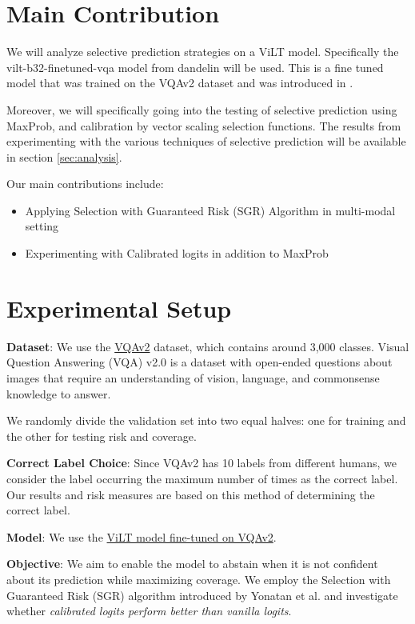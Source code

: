 \documentclass[
	english,
	accentcolor=8b,
	type=intern,
	marginpar=false
	]{tudapub}
\begin{document}
\section{Main Contribution}
\label{sec:approach}
We will analyze selective prediction strategies on a ViLT model. Specifically the vilt-b32-finetuned-vqa model from dandelin will be used. This is a fine tuned model that was trained on the VQAv2 dataset and was introduced in \cite{kim2021viltvisionandlanguagetransformerconvolution}. \par
Moreover, we will specifically going into the testing of selective prediction using MaxProb, and calibration by vector scaling selection functions. The results from experimenting with the various techniques of selective prediction will be available in section \ref{sec:analysis}. \par
Our main contributions include:
\begin{itemize}
  \item Applying Selection with Guaranteed Risk (SGR) Algorithm \cite{geifman2017selectiveclassificationdeepneural} in multi-modal setting
  \item Experimenting with Calibrated logits in addition to MaxProb
\end{itemize}

\section{Experimental Setup}
\label{sec:experiments}

\textbf{Dataset}: We use the \href{https://visualqa.org/download.html}{VQAv2} dataset, which contains around 3,000 classes. Visual Question Answering (VQA) v2.0 is a dataset with open-ended questions about images that require an understanding of vision, language, and commonsense knowledge to answer.

We randomly divide the validation set into two equal halves: one for training and the other for testing risk and coverage.

\textbf{Correct Label Choice}: Since VQAv2 has 10 labels from different humans, we consider the label occurring the maximum number of times as the correct label. Our results and risk measures are based on this method of determining the correct label.

\textbf{Model}: We use the \href{https://huggingface.co/dandelin/vilt-b32-finetuned-vqa}{ViLT model fine-tuned on VQAv2}.

\textbf{Objective}: We aim to enable the model to abstain when it is not confident about its prediction while maximizing coverage. We employ the Selection with Guaranteed Risk (SGR) algorithm introduced by Yonatan et al. \cite{geifman2017selectiveclassificationdeepneural} and investigate whether \textit{calibrated logits perform better than vanilla logits}.
\end{document}

